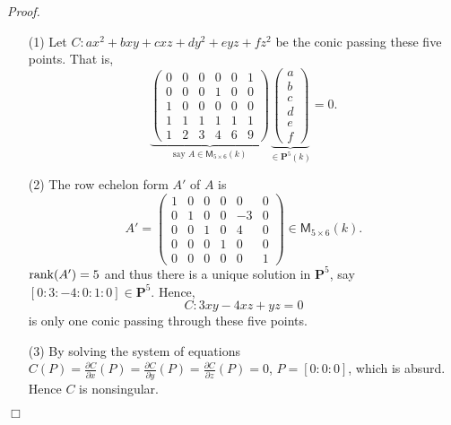 \documentclass{article}
\begin{document}
\emph{Proof.}
\begin{enumerate}
\item[(1)]
  Let $C: ax^2+bxy+cxz+dy^2+eyz+fz^2$ be the conic passing these five points.
  That is,
  \[
    \underbrace{\begin{pmatrix}
      0 & 0 & 0 & 0 & 0 & 1 \\
      0 & 0 & 0 & 1 & 0 & 0 \\
      1 & 0 & 0 & 0 & 0 & 0 \\
      1 & 1 & 1 & 1 & 1 & 1 \\
      1 & 2 & 3 & 4 & 6 & 9
    \end{pmatrix}}_{\text{say } A \in \mathsf{M}_{5 \times 6}(k)}
    \underbrace{\begin{pmatrix}
      a \\
      b \\
      c \\
      d \\
      e \\
      f
    \end{pmatrix}}_{\in \mathbf{P}^5(k)}
    = 0.
  \]

\item[(2)]
  The row echelon form $A'$ of $A$ is
  \[
    A'
    =
    \begin{pmatrix}
      1 & 0 & 0 & 0 & 0 & 0 \\
      0 & 1 & 0 & 0 & -3 & 0 \\
      0 & 0 & 1 & 0 & 4 & 0 \\
      0 & 0 & 0 & 1 & 0 & 0 \\
      0 & 0 & 0 & 0 & 0 & 1
    \end{pmatrix} \in \mathsf{M}_{5 \times 6}(k).
  \]
  $\rank(A') = 5$ and thus there is a unique solution in $\mathbf{P}^5$,
  say $[0:3:-4:0:1:0] \in \mathbf{P}^5$.
  Hence,
  \[
    C: 3xy - 4xz + yz = 0
  \]
  is only one conic passing through these five points.

\item[(3)]
  By solving the system of equations
  $C(P)
  = \frac{\partial C}{\partial x}(P)
  = \frac{\partial C}{\partial y}(P)
  = \frac{\partial C}{\partial z}(P) = 0$,
  $P = [0:0:0]$, which is absurd.
  Hence $C$ is nonsingular.
\end{enumerate}
$\Box$ \\\\



\end{document}
